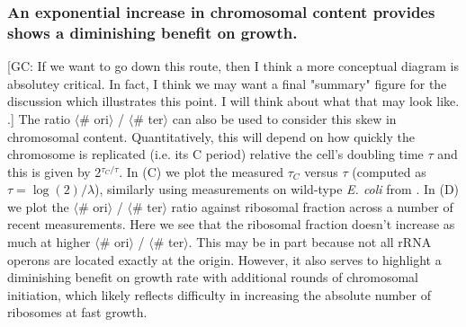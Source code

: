 \subsubsection{An exponential increase in chromosomal content provides shows
a diminishing benefit on growth.}
{\color{red}[GC: If we want to go down this route, then I think a more
conceptual diagram is absolutey critical. In fact, I think we may want a final
"summary" figure for the discussion which illustrates this point. I will think
about what that may look like. .]}
The ratio $\langle$\# ori$\rangle$ / $\langle$\# ter$\rangle$ can also be used
to consider this skew in chromosomal content. Quantitatively, this will depend
on how quickly the chromosome is replicated (i.e. its C period) relative the
cell's doubling time $\tau$ and this is given by 2$^{\tau_C / \tau}$. In
(C) we plot the measured $\tau_C$ versus $\tau$
(computed as $\tau = \log (2) / \lambda$), similarly using measurements on
wild-type \textit{E. coli} from  \citep{si2017}. In
(D) we plot the $\langle$\# ori$\rangle$ /
$\langle$\# ter$\rangle$ ratio against ribosomal fraction across a number of
recent measurements. Here we see that the ribosomal fraction doesn't increase as
much at higher $\langle$\# ori$\rangle$ / $\langle$\# ter$\rangle$. This may be
in part because not all rRNA operons are located exactly at the origin. However,
it also serves to highlight a diminishing  benefit on growth rate with
additional rounds of chromosomal initiation, which likely reflects  difficulty
in increasing the absolute number of ribosomes at fast growth.


